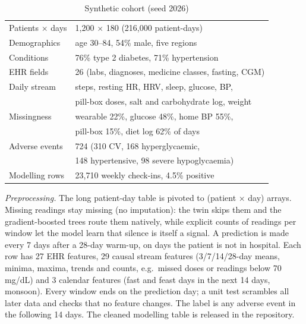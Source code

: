 \documentclass[conference]{IEEEtran}
\begin{document}
\begin{table}[H]
\caption{Synthetic cohort (seed 2026)}
\label{tab:data}
\centering
\footnotesize
\begin{tabular}{@{}ll@{}}
\toprule
Patients $\times$ days & 1{,}200 $\times$ 180 (216{,}000 patient-days)\\
Demographics & age 30--84, 54\% male, five regions\\
Conditions & 76\% type 2 diabetes, 71\% hypertension\\
EHR fields & 26 (labs, diagnoses, medicine classes, fasting, CGM)\\
Daily stream & steps, resting HR, HRV, sleep, glucose, BP,\\
 & pill-box doses, salt and carbohydrate log, weight\\
Missingness & wearable 22\%, glucose 48\%, home BP 55\%,\\
 & pill-box 15\%, diet log 62\% of days\\
Adverse events & 724 (310 CV, 168 hyperglycaemic,\\
 & 148 hypertensive, 98 severe hypoglycaemia)\\
Modelling rows & 23{,}710 weekly check-ins, 4.5\% positive\\
\bottomrule
\end{tabular}
\end{table}

\textit{Preprocessing.} The long patient-day table is pivoted to (patient $\times$ day) arrays. Missing readings stay missing (no imputation): the twin skips them and the gradient-boosted trees route them natively, while explicit counts of readings per window let the model learn that silence is itself a signal. A prediction is made every 7 days after a 28-day warm-up, on days the patient is not in hospital. Each row has 27 EHR features, 29 causal stream features (3/7/14/28-day means, minima, maxima, trends and counts, e.g.\ missed doses or readings below 70\,mg/dL) and 3 calendar features (fast and feast days in the next 14 days, monsoon). Every window ends on the prediction day; a unit test scrambles all later data and checks that no feature changes. The label is any adverse event in the following 14 days. The cleaned modelling table is released in the repository.
\end{document}
